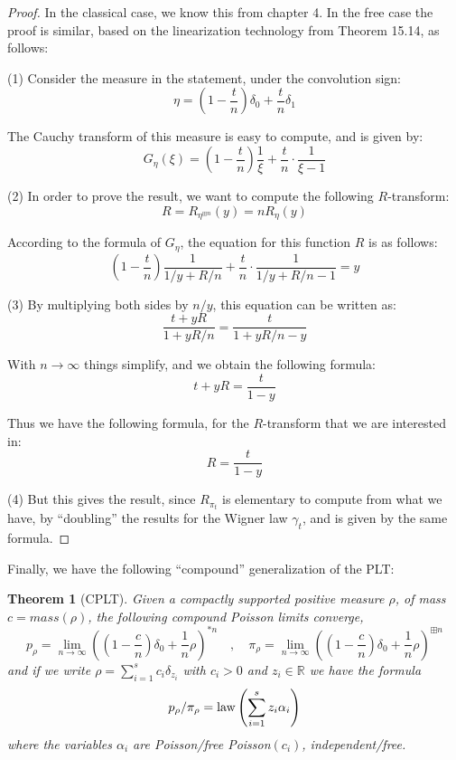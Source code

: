 \documentclass[12pt]{amsbook}
\newtheorem{theorem}{Theorem}[chapter]
\begin{document}
\begin{proof}
In the classical case, we know this from chapter 4. In the free case the proof is similar, based on the linearization technology from Theorem 15.14, as follows:

\medskip

(1) Consider the measure in the statement, under the convolution sign:
$$\eta=\left(1-\frac{t}{n}\right)\delta_0+\frac{t}{n}\delta_1$$

The Cauchy transform of this measure is easy to compute, and is given by:
$$G_\eta(\xi)=\left(1-\frac{t}{n}\right)\frac{1}{\xi}+\frac{t}{n}\cdot\frac{1}{\xi-1}$$

(2) In order to prove the result, we want to compute the following $R$-transform:
$$R
=R_{\eta^{\boxplus n}}(y)
=nR_\eta(y)$$

According to the formula of $G_\eta$, the equation for this function $R$ is as follows:
$$\left(1-\frac{t}{n}\right)\frac{1}{1/y+R/n}+\frac{t}{n}\cdot\frac{1}{1/y+R/n-1}=y$$

(3) By multiplying both sides by $n/y$, this equation can be written as:
$$\frac{t+yR}{1+yR/n}=\frac{t}{1+yR/n-y}$$

With $n\to\infty$ things simplify, and we obtain the following formula:
$$t+yR=\frac{t}{1-y}$$

Thus we have the following formula, for the $R$-transform that we are interested in:
$$R=\frac{t}{1-y}$$

(4) But this gives the result, since $R_{\pi_t}$ is elementary to compute from what we have, by ``doubling'' the results for the Wigner law $\gamma_t$, and is given by the same formula.
\end{proof}

Finally, we have the following ``compound'' generalization of the PLT:


\begin{theorem}[CPLT]
Given a compactly supported positive measure $\rho$, of mass $c=mass(\rho)$, the following compound Poisson limits converge,
$$p_\rho=\lim_{n\to\infty}\left(\left(1-\frac{c}{n}\right)\delta_0+\frac{1}{n}\rho\right)^{*n}
\quad,\quad 
\pi_\rho=\lim_{n\to\infty}\left(\left(1-\frac{c}{n}\right)\delta_0+\frac{1}{n}\rho\right)^{\boxplus n}$$
and if we write $\rho=\sum_{i=1}^sc_i\delta_{z_i}$ with $c_i>0$ and $z_i\in\mathbb R$ we have the formula
$$p_\rho/\pi_\rho={\rm law}\left(\sum_{i=1}^sz_i\alpha_i\right)$$
where the variables $\alpha_i$ are Poisson/free Poisson$(c_i)$, independent/free.
\end{theorem}
\end{document}
